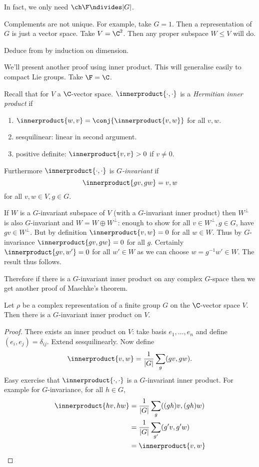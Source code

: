 \documentclass[a4paper]{article}
\newcommand*{\ip}{\innerproduct} %
\theoremstyle{definition}
\begin{document}
In fact, we only need \(\ch \F \ndivides |G|\).

\begin{remark}
  Complements are not unique. For example, take \(G = 1\). Then a representation of \(G\) is just a vector space. Take \(V = \C^2\). Then any proper subspace \(W \leq V\) will do.
\end{remark}

\begin{ex}
  Deduce  from  by induction on dimension.
\end{ex}

We'll present another proof using inner product. This will generalise easily to compact Lie groups. Take \(\F = \C\).

Recall that for \(V\) a \(\C\)-vector space. \(\ip{\cdot, \cdot}\) is a \emph{Hermitian inner product} if
\begin{enumerate}
\item \(\ip{w, v} = \conj{\ip{v, w}}\) for all \(v, w\).
\item sesquilinear: linear in second argument.
\item positive definite: \(\ip{v, v} > 0\) if \(v \neq 0\).
\end{enumerate}
Furthermore \(\ip{\cdot, \cdot}\) is \emph{\(G\)-invariant} if
\[
  \ip{gv, gw} = {v, w}
\]
for all \(v, w \in V, g \in G\).

If \(W\) is a \(G\)-invariant subspace of \(V\) (with a \(G\)-invariant inner product) then \(W^\perp\) is also \(G\)-invariant and \(W = W \oplus W^\perp\): enough to show for all \(v \in W^\perp, g \in G\), have \(gv \in W^\perp\). But by definition \(\ip{v, w} = 0\) for all \(w \in W\). Thus by \(G\)-invariance \(\ip{gv, gw} = 0\) for all \(g\). Certainly \(\ip{gv, w'} = 0\) for all \(w' \in W\) as we can choose \(w = g^{-1}w' \in W\). The result thus follows.

Therefore if there is a \(G\)-invariant inner product on any complex \(G\)-space then we get another proof of Maschke's theorem.

\begin{lemma}
  Let \(\rho\) be a complex representation of a finite group \(G\) on the \(\C\)-vector space \(V\). Then there is a \(G\)-invariant inner product on \(V\).
\end{lemma}

\begin{proof}
  There exists an inner product on \(V\): take basis \(e_1, \dots, e_n\) and define \((e_i, e_j) = \delta_{ij}\). Extend sesquilinearly. Now define
  \[
    \ip{v, w} = \frac{1}{|G|} \sum_g (gv, gw).
  \]
  Easy exercise that \(\ip{\cdot, \cdot}\) is a \(G\)-invariant inner product. For example for \(G\)-invariance, for all \(h \in G\),
  \begin{align*}
    \ip{hv, hw}
    &= \frac{1}{|G|} \sum_g ((gh)v, (gh)w) \\
    &= \frac{1}{|G|} \sum_{g'} (g'v, g'w) \\
    &= \ip{v, w}
  \end{align*}
\end{proof}
\end{document}
